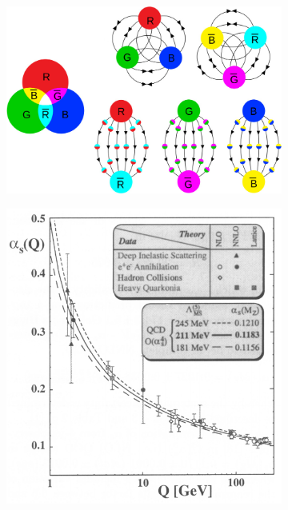 	\begin{figure}[H]
		\begin{subfigure}{0.6\linewidth}
			\centering
			\includegraphics[width=0.7\plotwidth]{fig/chapt2/QCD-colour-field.jpg}
			\caption{\label{fig:QCD:A}}
		\end{subfigure}
		\begin{subfigure}{0.4\linewidth}
			\centering
			\includegraphics[width=0.5\plotwidth]{fig/chapt2/QCD-asymptotic-freedom.png}

\end{subfigure}
\end{figure}
